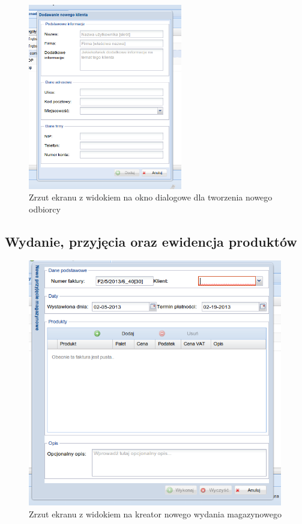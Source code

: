 		\begin{figure}[H]
			\centering
			\includegraphics[width=0.6\textwidth]{images/app/new_receipient_dialog}
			\caption[Aplikacja - Dodawania nowego klienta - odbiorcy]{Zrzut ekranu z widokiem na okno dialogowe dla tworzenia nowego odbiorcy}
			\label{c7:fig:app:new_receipient_dialog}
		\end{figure}	
		
	\subsection{Wydanie, przyjęcia oraz ewidencja produktów}
		\begin{figure}[H]
			\centering
			\includegraphics[width=0.99\textwidth]{images/app/new_supply_preview}
			\caption[Aplikacja - Dodanie nowego dokumentu wydania]{Zrzut ekranu z widokiem na kreator nowego wydania magazynowego}
			\label{c7:fig:app:new_supply_preview}
		\end{figure}
		
